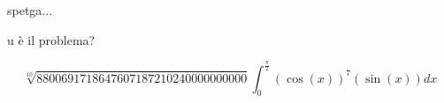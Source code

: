 \noindent
spetga...

u è il problema?


$$\sqrt[10]{8800691718647607187210240000000000}\int_0^{\frac{\pi}{2}} (\cos{(x)})^7(\sin{(x)}) dx$$


